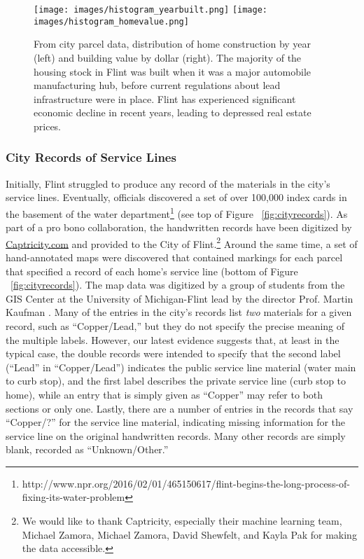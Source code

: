 \documentclass[sigconf]{acmart}
\begin{document}
\begin{figure}[h]
\begin{center}
\texttt{[image: images/histogram\_yearbuilt.png]}
\texttt{[image: images/histogram\_homevalue.png]}
\caption{From city parcel data, distribution of home construction by year (left) and building value by dollar (right).  The majority of the housing stock in Flint was built when it was a major automobile manufacturing hub, before current regulations about lead infrastructure were in place.  Flint has experienced significant economic decline in recent years, leading to depressed real estate prices.}
\label{fig:parcel_summaries}
\end{center}
\end{figure}





\subsubsection{City Records of Service Lines}
\label{sec:cityrecords}

Initially, Flint struggled to produce any record of the materials in the city's service lines. Eventually, officials discovered a set of over 100,000 index cards in the basement of the water department\footnote{http://www.npr.org/2016/02/01/465150617/flint-begins-the-long-process-of-fixing-its-water-problem} (see top of Figure ~\ref{fig:cityrecords}). As part of a pro bono collaboration, the handwritten records have been digitized by \url{Captricity.com} and provided to the City of Flint.\footnote{We would like to thank Captricity, especially their machine learning team, Michael Zamora, Michael Zamora, David Shewfelt, and Kayla Pak for making the data accessible.} Around the same time, a set of hand-annotated maps were discovered that contained markings for each parcel that specified a record of each home's service line (bottom of Figure ~\ref{fig:cityrecords}). The map data was digitized by a group of students from the GIS Center at the University of Michigan-Flint lead by the director Prof. Martin Kaufman \cite{Mlive-Flintdataonleadwater:url}. Many of the entries in the city's records list \emph{two} materials for a given record, such as ``Copper/Lead,'' but they do not specify the precise meaning of the multiple labels. However, our latest evidence suggests that, at least in the typical case, the double records were intended to specify that the second label (``Lead'' in ``Copper/Lead'') indicates the public service line material (water main to curb stop), and the first label describes the private service line (curb stop to home), while an entry that is simply given as ``Copper'' may refer to both sections or only one. Lastly, there are a number of entries in the records that say ``Copper/?'' for the service line material, indicating missing information for the service line on the original handwritten records. Many other records are simply blank, recorded as ``Unknown/Other.''
\end{document}
